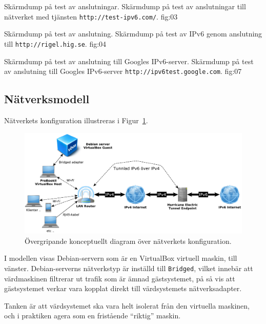            {Skärmdump på test av anslutningar.}
           {Skärmdump på test av anslutningar till nätverket med tjänsten
            \texttt{http://test-ipv6.com/}.}
           {fig:03}

           {Skärmdump på test av anslutning.}
					 {Skärmdump på test av IPv6 genom anslutning till
						\texttt{http://rigel.hig.se}.}
           {fig:04}

           {Skärmdump på test av anslutning till Googles IPv6-server.}
					 {Skärmdump på test av anslutning till Googles IPv6-server 
				    \texttt{http://ipv6test.google.com}.}
           {fig:07}


\subsection{Nätverksmodell}
Nätverkets konfiguration illustreras i Figur~\ref{fig:networkgraph}.

\begin{figure}[H]
  \centering
  \includegraphics[width=\linewidth]{include/networkgraph}
  \caption[Diagram över nätverkets konfiguration.]
          {Övergripande konceptuellt diagram över nätverkets
           konfiguration.}
  \label{fig:networkgraph}
\end{figure}


I modellen visas Debian-servern som är en VirtualBox virtuell maskin, till
vänster. Debian-serverns nätverkstyp är inställd till \texttt{Bridged}, vilket
innebär att värdmaskinen filtrerar ut trafik som är ämnad gästsystemet, på så
vis att gästsystemet verkar vara kopplat direkt till värdsystemets
nätverksadapter. \cite{virtualbox:bridged}

Tanken är att värdsystemet ska vara helt isolerat från den virtuella maskinen,
och i praktiken agera som en fristående ``riktig'' maskin.


